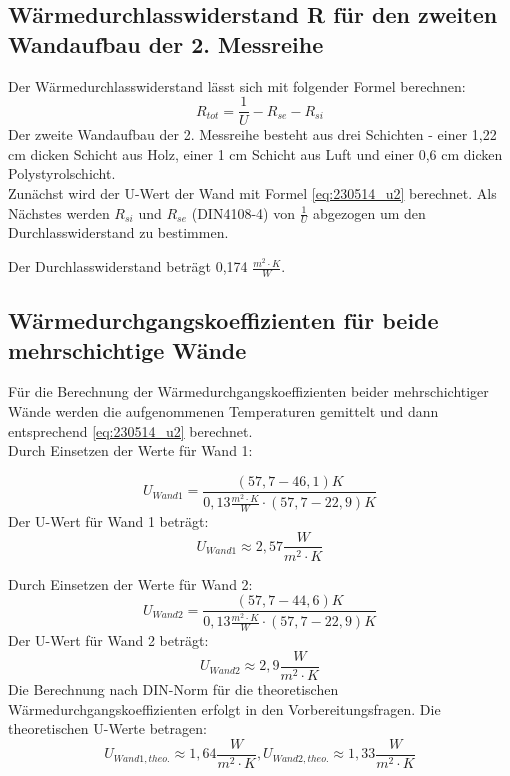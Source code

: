 \subsection{Wärmedurchlasswiderstand R für den zweiten Wandaufbau der 2. Messreihe}
Der Wärmedurchlasswiderstand lässt sich mit folgender Formel berechnen:
%
\begin{equation}
R_{tot}=\frac{1} {U} - R_{se} - R_{si}
  \label{eq:230522_Wärmewiderstand}
\end{equation}
%
Der zweite Wandaufbau der 2. Messreihe besteht aus drei Schichten - einer 1,22 cm dicken Schicht aus Holz, einer 1 cm Schicht aus Luft und einer 0,6 cm dicken Polystyrolschicht.\\
Zunächst wird der U-Wert der Wand mit Formel \ref{eq:230514_u2}  berechnet. Als Nächstes werden $R_{si}$ und $R_{se}$ (DIN4108-4) von  $\frac{1}{U}$ abgezogen um den Durchlasswiderstand zu bestimmen. 

Der Durchlasswiderstand beträgt 0,174 $\frac{ m^2 \cdot K }{W}$. 

\subsection{Wärmedurchgangskoeffizienten für beide mehrschichtige Wände}
Für die Berechnung der Wärmedurchgangskoeffizienten beider mehrschichtiger Wände werden die aufgenommenen Temperaturen gemittelt und dann entsprechend \autoref{eq:230514_u2} berechnet.\\
Durch Einsetzen der Werte für Wand 1:

$$U_{Wand1} = \frac{(57,7-46,1)K }{ 0,13 \frac{m^2\cdot K}{W}\cdot  (57,7 - 22,9)K}$$
Der U-Wert für Wand 1 beträgt:
\begin{equation*}
  U_{Wand 1} \approx 2,57 \frac{W}{m^2 \cdot K}
\end{equation*}

Durch Einsetzen der Werte für Wand 2:
$$U_{Wand2} = \frac{(57,7-44,6)K }{ 0,13 \frac{m^2\cdot K}{W}\cdot  (57,7 - 22,9)K}$$
Der U-Wert für Wand 2 beträgt:
\begin{equation*}
  U_{Wand 2} \approx 2,9 \frac{W}{m^2 \cdot K}
\end{equation*}
\newpage
Die Berechnung nach DIN-Norm für die theoretischen Wärmedurchgangskoeffizienten erfolgt in den Vorbereitungsfragen.
Die theoretischen U-Werte betragen:
\begin{equation*}
  U_{Wand 1,theo.}\approx 1,64 \frac{W}{m^2 \cdot K}, U_{Wand 2,theo.}\approx 1,33 \frac{W}{m^2 \cdot K}
\end{equation*}

